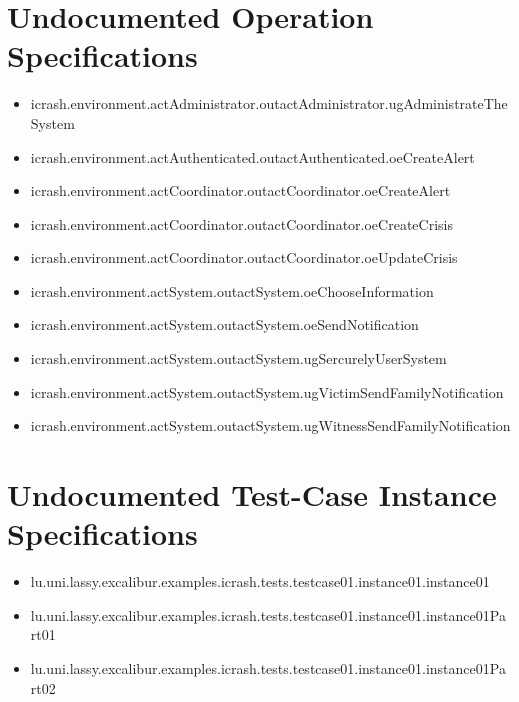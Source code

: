 \section[Undocumented Operation Specifications]{Undocumented Operation Specifications}
\begin{itemize}
\item icrash.environment.actAdministrator.outactAdministrator.ugAdministrateTheSystem 
\item icrash.environment.actAuthenticated.outactAuthenticated.oeCreateAlert 
\item icrash.environment.actCoordinator.outactCoordinator.oeCreateAlert 
\item icrash.environment.actCoordinator.outactCoordinator.oeCreateCrisis 
\item icrash.environment.actCoordinator.outactCoordinator.oeUpdateCrisis 
\item icrash.environment.actSystem.outactSystem.oeChooseInformation 
\item icrash.environment.actSystem.outactSystem.oeSendNotification 
\item icrash.environment.actSystem.outactSystem.ugSercurelyUserSystem 
\item icrash.environment.actSystem.outactSystem.ugVictimSendFamilyNotification 
\item icrash.environment.actSystem.outactSystem.ugWitnessSendFamilyNotification 
\end{itemize}





\section[Undocumented Test-Case Instance Specifications]{Undocumented Test-Case Instance Specifications}
\begin{itemize}
\item lu.uni.lassy.excalibur.examples.icrash.tests.testcase01.instance01.instance01 
\item lu.uni.lassy.excalibur.examples.icrash.tests.testcase01.instance01.instance01Part01 
\item lu.uni.lassy.excalibur.examples.icrash.tests.testcase01.instance01.instance01Part02 
\end{itemize}



